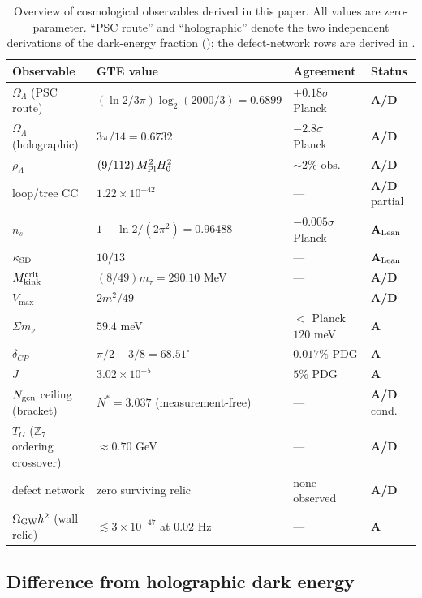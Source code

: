 \documentclass[11pt]{article}
\theoremstyle{remark}
\newcommand{\ZS}{\mathbb{Z}_7}
\newcommand{\Mkink}{M_{\rm kink}}
\newcommand{\mtau}{m_\tau}
\newcommand{\MPl}{M_{\rm Pl}}
\newcommand{\Hnought}{H_0}
\newcommand{\OmL}{\Omega_\Lambda}
\newcommand{\ns}{n_s}
\newcommand{\kSD}{\kappa_{\rm SD}}
\newcommand{\CatA}{\textbf{A}}
\newcommand{\CatAL}{\ensuremath{\textbf{A}_{\rm Lean}}}
\newcommand{\CatAD}{\textbf{A/D}}
\begin{document}
\begin{table}[h]
\centering
\small
\begin{tabularx}{\textwidth}{@{}lP{4.3cm}P{3.0cm}l@{}}
\toprule
\textbf{Observable} & \textbf{GTE value} & \textbf{Agreement} & \textbf{Status} \\
\midrule
$\OmL$ (PSC route) & $(\ln2/3\pi)\log_2(2000/3) = 0.6899$ & $+0.18\sigma$ Planck & \CatAD \\
$\OmL$ (holographic) & $3\pi/14 = 0.6732$ & $-2.8\sigma$ Planck & \CatAD \\
$\rho_\Lambda$ & $(9/112)\,\MPl^2\Hnought^2$ & $\sim 2\%$ obs. & \CatAD \\
loop/tree CC & $1.22\times10^{-42}$ & --- & \CatAD-partial \\
$\ns$ & $1 - \ln2/(2\pi^2) = 0.96488$ & $-0.005\sigma$ Planck & \CatAL \\
$\kSD$ & $10/13$ & --- & \CatAL \\
$\Mkink^{\rm crit}$ & $(8/49)\mtau = 290.10$ MeV & --- & \CatAD \\
$V_{\max}$ & $2m^2/49$ & --- & \CatAD \\
$\Sigma m_\nu$ & $59.4$ meV & $<$ Planck $120$ meV & \CatA \\
$\delta_{CP}$ & $\pi/2 - 3/8 = 68.51^\circ$ & $0.017\%$ PDG & \CatA \\
$J$ & $3.02\times10^{-5}$ & $5\%$ PDG & \CatA \\
$N_{\rm gen}$ ceiling (bracket) & $N^* = 3.037$ (measurement-free) & --- & \CatAD{} cond. \\
$T_G$ ($\ZS$ ordering crossover) & $\approx 0.70$ GeV & --- & \CatAD \\
defect network & zero surviving relic & none observed & \CatAD \\
$\Omega_{\rm GW}h^2$ (wall relic) & $\lesssim 3\times10^{-47}$ at $0.02$ Hz & --- & \CatA \\
\bottomrule
\end{tabularx}
\caption{Overview of cosmological observables derived in this paper. All values
are zero-parameter. ``PSC route'' and ``holographic'' denote the two independent
derivations of the dark-energy fraction (); the defect-network rows
are derived in .}
\label{tab:overview}
\end{table}

\subsection{Difference from holographic dark energy}
\end{document}
